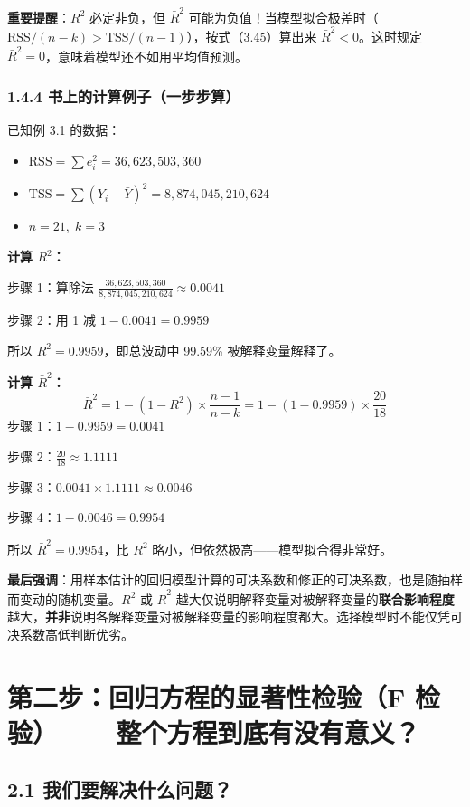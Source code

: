 \documentclass[12pt,a4paper]{ctexart}
\begin{document}
\textbf{重要提醒}：\(R^2\) 必定非负，但 \(\bar{R}^2\) 可能为负值！当模型拟合极差时（\(\text{RSS}/(n-k) > \text{TSS}/(n-1)\)），按式（3.45）算出来 \(\bar{R}^2 < 0\)。这时规定 \(\bar{R}^2 = 0\)，意味着模型还不如用平均值预测。

\subsubsection{1.4.4 书上的计算例子（一步步算）}

已知例 3.1 的数据：
\begin{itemize}
    \item \(\text{RSS} = \sum e_i^2 = 36,623,503,360\)
    \item \(\text{TSS} = \sum(Y_i - \bar{Y})^2 = 8,874,045,210,624\)
    \item \(n = 21,\; k = 3\)
\end{itemize}

\textbf{计算 \(R^2\)：}

步骤 1：算除法 \(\frac{36,623,503,360}{8,874,045,210,624} \approx 0.0041\)

步骤 2：用 1 减 \(1 - 0.0041 = 0.9959\)

所以 \(R^2 = 0.9959\)，即总波动中 99.59\% 被解释变量解释了。

\textbf{计算 \(\bar{R}^2\)：}
\[
\bar{R}^2 = 1 - (1 - R^2) \times \frac{n-1}{n-k} = 1 - (1 - 0.9959) \times \frac{20}{18}
\]
步骤 1：\(1 - 0.9959 = 0.0041\)

步骤 2：\(\frac{20}{18} \approx 1.1111\)

步骤 3：\(0.0041 \times 1.1111 \approx 0.0046\)

步骤 4：\(1 - 0.0046 = 0.9954\)

所以 \(\bar{R}^2 = 0.9954\)，比 \(R^2\) 略小，但依然极高——模型拟合得非常好。

\textbf{最后强调}：用样本估计的回归模型计算的可决系数和修正的可决系数，也是随抽样而变动的随机变量。\(R^2\) 或 \(\bar{R}^2\) 越大仅说明解释变量对被解释变量的\textbf{联合影响程度}越大，\textbf{并非}说明各解释变量对被解释变量的影响程度都大。选择模型时不能仅凭可决系数高低判断优劣。

\section{第二步：回归方程的显著性检验（F 检验）——整个方程到底有没有意义？}

\subsection{2.1 我们要解决什么问题？}
\end{document}
